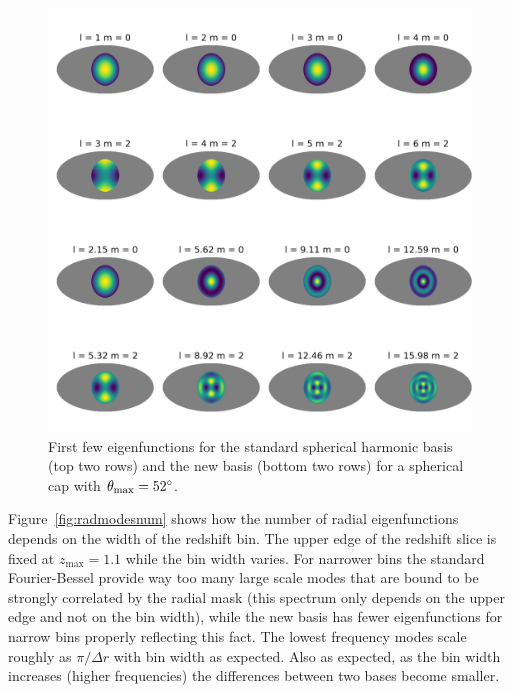 \documentclass[fleqn,usenatbib]{mnras}
\begin{document}
\begin{figure}
\includegraphics[clip,trim={0 1cm 0 1cm},width=\textwidth]{map.png}
\caption{First few eigenfunctions for the standard spherical harmonic basis
(top two rows) and the new basis (bottom two rows) for a spherical cap with
$\theta_\mathrm{max} = 52\degree$.}
\label{fig:angmodes}
\end{figure}

Figure~\ref{fig:radmodesnum} shows how the number of radial eigenfunctions
depends on the width of the redshift bin. The upper edge of the redshift slice
is fixed at $z_\mathrm{max} = 1.1$ while the bin width varies. For narrower
bins the standard Fourier-Bessel provide way too many large scale modes that
are bound to be strongly correlated by the radial mask (this spectrum only
depends on the upper edge and not on the bin width), while the new basis has
fewer eigenfunctions for narrow bins properly reflecting this fact. The lowest
frequency modes scale roughly as $\pi/\Delta r$ with bin width as expected.
Also as expected, as the bin width increases (higher frequencies) the
differences between two bases become smaller.
\end{document}
